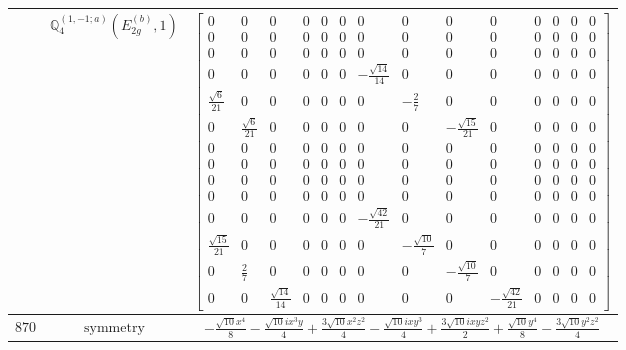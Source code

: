 \documentclass[fleqn,8pt,landscape]{jsarticle}
\begin{document}
\begin{longtable}{ccc}
$  $ & $ \mathbb{Q}_{4}^{(1,-1;a)}(E_{2g}^{(b)},1) $ & $ \begin{bmatrix} 0 & 0 & 0 & 0 & 0 & 0 & 0 & 0 & 0 & 0 & 0 & 0 & 0 & 0 \\ 0 & 0 & 0 & 0 & 0 & 0 & 0 & 0 & 0 & 0 & 0 & 0 & 0 & 0 \\ 0 & 0 & 0 & 0 & 0 & 0 & 0 & 0 & 0 & 0 & 0 & 0 & 0 & 0 \\ 0 & 0 & 0 & 0 & 0 & 0 & - \frac{\sqrt{14}}{14} & 0 & 0 & 0 & 0 & 0 & 0 & 0 \\ \frac{\sqrt{6}}{21} & 0 & 0 & 0 & 0 & 0 & 0 & - \frac{2}{7} & 0 & 0 & 0 & 0 & 0 & 0 \\ 0 & \frac{\sqrt{6}}{21} & 0 & 0 & 0 & 0 & 0 & 0 & - \frac{\sqrt{15}}{21} & 0 & 0 & 0 & 0 & 0 \\ 0 & 0 & 0 & 0 & 0 & 0 & 0 & 0 & 0 & 0 & 0 & 0 & 0 & 0 \\ 0 & 0 & 0 & 0 & 0 & 0 & 0 & 0 & 0 & 0 & 0 & 0 & 0 & 0 \\ 0 & 0 & 0 & 0 & 0 & 0 & 0 & 0 & 0 & 0 & 0 & 0 & 0 & 0 \\ 0 & 0 & 0 & 0 & 0 & 0 & 0 & 0 & 0 & 0 & 0 & 0 & 0 & 0 \\ 0 & 0 & 0 & 0 & 0 & 0 & - \frac{\sqrt{42}}{21} & 0 & 0 & 0 & 0 & 0 & 0 & 0 \\ \frac{\sqrt{15}}{21} & 0 & 0 & 0 & 0 & 0 & 0 & - \frac{\sqrt{10}}{7} & 0 & 0 & 0 & 0 & 0 & 0 \\ 0 & \frac{2}{7} & 0 & 0 & 0 & 0 & 0 & 0 & - \frac{\sqrt{10}}{7} & 0 & 0 & 0 & 0 & 0 \\ 0 & 0 & \frac{\sqrt{14}}{14} & 0 & 0 & 0 & 0 & 0 & 0 & - \frac{\sqrt{42}}{21} & 0 & 0 & 0 & 0 \end{bmatrix} $ \\ \hline
$ 870 $ & $ \text{symmetry} $ & $ - \frac{\sqrt{10} x^{4}}{8} - \frac{\sqrt{10} i x^{3} y}{4} + \frac{3 \sqrt{10} x^{2} z^{2}}{4} - \frac{\sqrt{10} i x y^{3}}{4} + \frac{3 \sqrt{10} i x y z^{2}}{2} + \frac{\sqrt{10} y^{4}}{8} - \frac{3 \sqrt{10} y^{2} z^{2}}{4} $ \\

\end{longtable}
\end{document}
